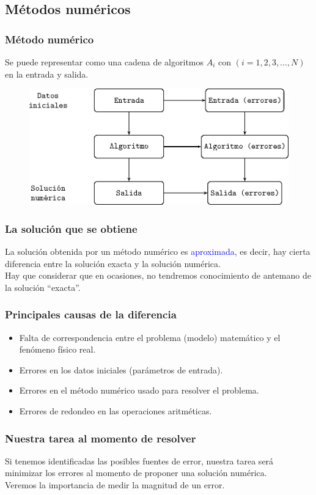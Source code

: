 \subsection{Métodos numéricos}
\begin{frame}
\frametitle{Método numérico}
Se puede representar como una cadena de algoritmos $A_{i}$ con $(i = 1, 2, 3, \ldots , N)$ en la entrada y salida.
\begin{figure}
\centering
\includegraphics[scale=0.7]{dibujometodonum.eps} 
\end{figure}
\end{frame}
\begin{frame}
\frametitle{La solución que se obtiene}
La solución obtenida por un método numérico es \textcolor{blue}{aproximada}, es decir, hay cierta diferencia entre la solución exacta y la solución numérica.
\\
\bigskip
\pause
Hay que considerar que en ocasiones, no tendremos conocimiento de antemano de la solución \enquote{exacta}.
\end{frame}
\begin{frame}
\frametitle{Principales causas de la diferencia}
\begin{itemize}[<+->]
\item Falta de correspondencia entre el problema (modelo) matemático y el fenómeno físico real.
\item Errores en los datos iniciales (parámetros de entrada).
\item Errores en el método numérico usado para resolver el problema.
\item Errores de redondeo en las operaciones aritméticas.
\end{itemize}
\end{frame}
\begin{frame}[fragile]
\frametitle{Nuestra tarea al momento de resolver}
Si tenemos identificadas las posibles fuentes de error, nuestra tarea será minimizar los errores al momento de proponer una solución numérica.
\\
\bigskip
\pause
Veremos la importancia de medir la magnitud de un error.
\end{frame}
